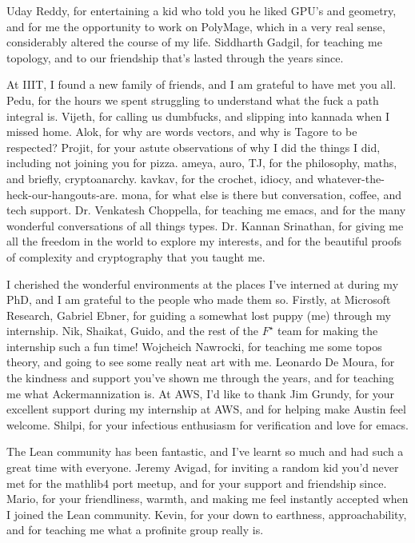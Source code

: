 Uday Reddy, for entertaining a kid who told you he liked GPU's and geometry,
and for me the opportunity to work on PolyMage, which in a very real sense, considerably altered the course of my life.
Siddharth Gadgil, for teaching me topology, and to our friendship that's lasted through the years since.


At IIIT, I found a new family of friends, and I am grateful to have met you all.
Pedu, for the hours we spent struggling to understand what the fuck a path integral is.
Vijeth, for calling us dumbfucks, and slipping into kannada when I missed home.
Alok, for why are words vectors, and why is Tagore to be respected?
Projit, for your astute observations of why I did the things I did, including not joining you for pizza.
ameya, auro, TJ, for the philosophy, maths, and briefly, cryptoanarchy.
kavkav, for the crochet, idiocy, and whatever-the-heck-our-hangouts-are.
mona, for what else is there but conversation, coffee, and tech support.
Dr. Venkatesh Choppella, for teaching me emacs,
and for the many wonderful conversations of all things types.
%
Dr. Kannan Srinathan, for giving me all the freedom in the world to explore my interests,
and for the beautiful proofs of complexity and cryptography that you taught me.
%



I cherished the wonderful environments at the places I've interned at during my PhD, and I am grateful to the people who made them so.
Firstly, at Microsoft Research, Gabriel Ebner, for guiding a somewhat lost puppy (me) through my internship.
Nik, Shaikat, Guido, and the rest of the $F^{\star}$ team for making the internship such a fun time!
Wojcheich Nawrocki, for teaching me some topos theory, and going to see some really neat art with me.
Leonardo De Moura, for the kindness and support you've shown me through the years, and for teaching me what Ackermannization is.
At AWS, I'd like to thank Jim Grundy, for your excellent support during my internship at AWS, and for helping make Austin feel welcome.
Shilpi, for your infectious enthusiasm for verification and love for emacs.



The Lean community has been fantastic, and I've learnt so much and had such a great time with everyone. 
Jeremy Avigad, for inviting a random kid you'd never met for the mathlib4 port meetup,
and for your support and friendship since.
Mario, for your friendliness, warmth, and making me feel instantly accepted when I joined the Lean community.
Kevin, for your down to earthness, approachability, and for teaching me what a profinite group really is.


